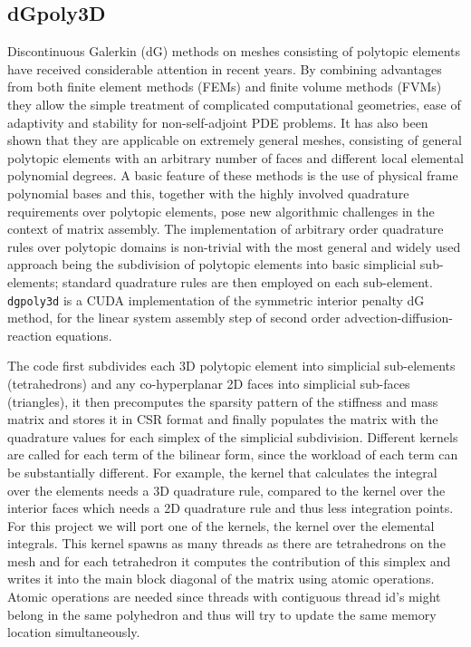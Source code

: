 \subsection{dGpoly3D}\label{dgpoly3d}
Discontinuous Galerkin (dG) methods on meshes consisting of polytopic elements have received considerable attention in recent years. By combining advantages from both finite element methods (FEMs) and finite volume methods (FVMs) they allow the simple treatment of complicated computational geometries, ease of adaptivity and stability for non-self-adjoint PDE problems. It has also been shown that they are applicable on extremely general meshes, consisting of general polytopic elements with an arbitrary number of faces and different local elemental polynomial degrees. A basic feature of these methods is the use of physical frame polynomial bases and this, together with the highly involved quadrature requirements over polytopic elements, pose new algorithmic challenges in the context of matrix assembly. The implementation of arbitrary order quadrature rules over polytopic domains is non-trivial with the most general and widely used approach being the subdivision of polytopic elements into basic simplicial sub-elements; standard quadrature rules are then employed on each sub-element. \texttt{dgpoly3d} \cite{dong_gpu-accelerated_2021} is a CUDA implementation of the symmetric interior penalty dG method, for the linear system assembly step of second order advection-diffusion-reaction equations.

The code first subdivides each 3D polytopic element into simplicial sub-elements (tetrahedrons) and any co-hyperplanar 2D faces into simplicial sub-faces (triangles), it then precomputes the sparsity pattern of the stiffness and mass matrix and stores it in CSR format and finally populates the matrix with the quadrature values for each simplex of the simplicial subdivision. Different kernels are called for each term of the bilinear form, since the workload of each term can be substantially different. For example, the kernel that calculates the integral over the elements needs a 3D quadrature rule, compared to the kernel over the interior faces which needs a 2D quadrature rule and thus less integration points. For this project we will port one of the kernels, the kernel over the elemental integrals. This kernel spawns as many threads as there are tetrahedrons on the mesh and for each tetrahedron it computes the contribution of this simplex and writes it into the main block diagonal of the matrix using atomic operations. Atomic operations are needed since threads with contiguous thread id's might belong in the same polyhedron and thus will try to update the same memory location simultaneously.

